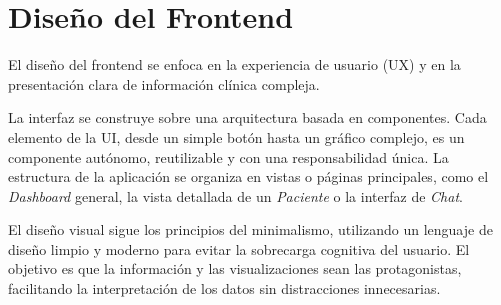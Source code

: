 \section{Diseño del Frontend}

El diseño del frontend se enfoca en la experiencia de usuario (UX) y en la presentación clara de información clínica compleja.


La interfaz se construye sobre una arquitectura basada en componentes. Cada elemento de la UI, desde un simple botón hasta un gráfico complejo, es un componente autónomo, reutilizable y con una responsabilidad única. La estructura de la aplicación se organiza en vistas o páginas principales, como el \textit{Dashboard} general, la vista detallada de un \textit{Paciente} o la interfaz de \textit{Chat}.

El diseño visual sigue los principios del minimalismo, utilizando un lenguaje de diseño limpio y moderno para evitar la sobrecarga cognitiva del usuario. El objetivo es que la información y las visualizaciones sean las protagonistas, facilitando la interpretación de los datos sin distracciones innecesarias.



